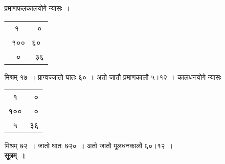 \documentclass[11pt, openany]{book}
\begin{document}
प्रमाणफलकालयोगे न्यासः~। \begin{small}\begin{tabular}{c|}
~१~~ ~~० \\
१००~ ६० \\
~~०~~ ~३६
\end{tabular}\end{small}\; मिश्रम् १७~। प्राग्वज्जातो घातः ६०~। अतो जातौ प्रमाणकालौ ५।१२~। कालधनयोगे न्यासः \begin{small}\begin{tabular}{c|c|}
~१~ & ~० \\
१०० & ~० \\
~५~ & ३६
\end{tabular}\end{small}\; मिश्रम् ७२~। जातो घातः ७२०~। अतो जातौ मूलधनकालौ ६०।१२~।\\

\noindent \textbf{सूत्रम्~।}
\end{document}
